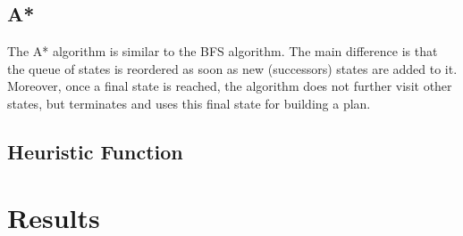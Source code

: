 \documentclass[10pt]{article}
\begin{document}
%



\subsection{A*}
The A* algorithm is similar to the BFS algorithm. The main difference is that the queue of states is reordered as soon as new (successors) states are added to it. Moreover, once a final state is reached, the algorithm does not further visit other states, but terminates and uses this final state for building a plan.

\subsection{Heuristic Function}

\section{Results}
\end{document}
